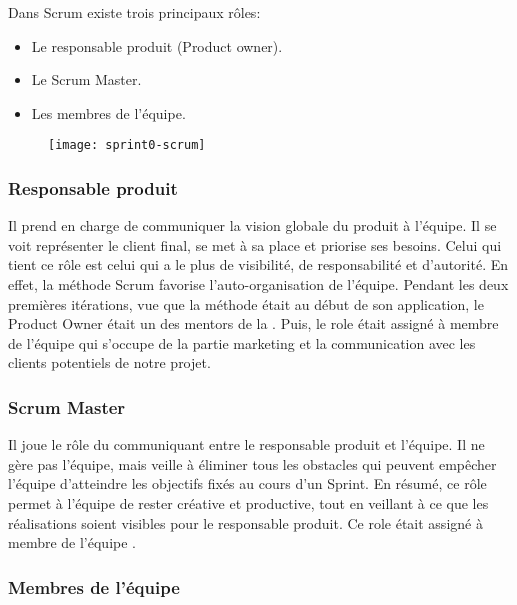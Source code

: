 Dans Scrum existe trois principaux rôles:

\begin{itemize}
    \item Le responsable produit (Product owner).
    \item Le Scrum Master.
    \item Les membres de l'équipe.
\end{itemize}

\begin{figure}[!h]
    \centering
    \texttt{[image: sprint0-scrum]}
    \caption{}
    \label{fig:sprint0-scrum}
\end{figure}

\subsubsection{Responsable produit }

Il prend en charge de communiquer la vision globale du produit à l'équipe. Il
se voit représenter le client final, se met à sa place et priorise ses besoins.
Celui qui tient ce rôle est celui qui a le plus de visibilité, de
responsabilité et d'autorité. En effet, la méthode Scrum favorise
l'auto-organisation de l'équipe. Pendant les deux premières itérations, vue que
la méthode était au début de son application, le Product Owner était un des
mentors de la . Puis, le role était assigné à membre
de l'équipe qui s'occupe de la partie marketing et la communication avec les
clients potentiels de notre projet.

\subsubsection{Scrum Master}

Il joue le rôle du communiquant entre le responsable produit et l'équipe. Il ne
gère pas l'équipe, mais veille à éliminer tous les obstacles qui peuvent
empêcher l'équipe d'atteindre les objectifs fixés au cours d'un Sprint. En
résumé, ce rôle permet à l'équipe de rester créative et productive, tout en
veillant à ce que les réalisations soient visibles pour le responsable produit.
Ce role était assigné à membre de l'équipe .

\subsubsection{Membres de l'équipe}

